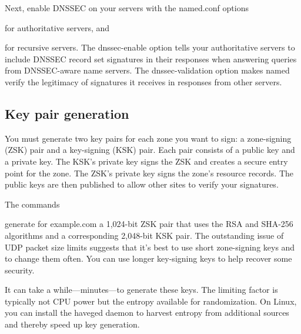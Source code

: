Next, enable DNSSEC on your servers with the {named.conf} options


for authoritative servers, and


for recursive servers. The {dnssec-enable} option tells your
authoritative servers to include DNSSEC record set signatures in their
responses when answering queries from DNSSEC-aware name servers. The
{dnssec-validation} option makes {named} verify the legitimacy of
signatures it receives in responses from other servers.

\protect\hypertarget{part0024_split_063.html}{}{}

\hypertarget{part0024_split_063.htmlux5cux23_idContainer1069}{}
\hypertarget{part0024_split_063.htmlux5cux23calibre_pb_62}{%
\subsection[Key pair
generation]{\texorpdfstring{\protect\hypertarget{part0024_split_063.htmlux5cux23_idTextAnchor942}{}{}Key
pair
generation}{Key pair generation}}\label{part0024_split_063.htmlux5cux23calibre_pb_62}}

You must generate two key pairs for each zone you want to sign: a
zone-signing (ZSK) pair and a key-signing (KSK) pair. Each pair consists
of a public key and a private key. The KSK's private key signs the ZSK
and creates a secure entry point for the zone. The ZSK's private key
signs the zone's resource records. The public keys are then published to
allow other sites to verify your signatures.

The commands


\protect\hypertarget{part0024_split_063.htmlux5cux23_idIndexMarker2262}{}{}\protect\hypertarget{part0024_split_063.htmlux5cux23_idIndexMarker2263}{}{}generate
for example.com a 1,024-bit ZSK pair that uses the RSA and SHA-256
algorithms and a corresponding 2,048-bit KSK pair. The outstanding issue
of UDP packet size limits suggests that it's best to use short
zone-signing keys and to change them often. You can use longer
key-signing keys to help recover some security.

It can take a while---minutes---to generate these keys. The limiting
factor is typically not CPU power but the entropy available for
randomization. On Linux, you can install the {haveged} daemon to harvest
entropy from additional sources and thereby speed up key generation.

